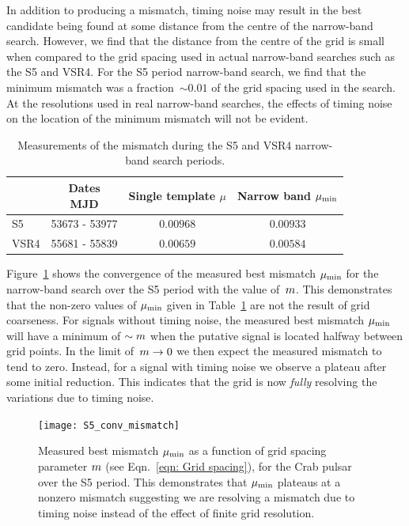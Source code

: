 \documentclass[../full_thesis/full_thesis.tex]{subfiles}
\begin{document}
In addition to producing a mismatch, timing noise may result in the best
candidate being found at some distance from the centre of the narrow-band
search.  However, we find that the distance from the centre of the grid is
small when compared to the grid spacing used in actual narrow-band searches
such as the S5 and VSR4.  For the S5 period narrow-band search, we find that
the minimum mismatch was a fraction~$\sim 0.01$ of the grid spacing used in the
\citet{ligo2008} search.  At the resolutions used in real narrow-band searches,
the effects of timing noise on the location of the minimum mismatch will not be
evident.

\begingroup
\small
\begin{table}[ht]
\centering
\begin{tabular}{lccc}
    &
    \specialcell{Dates \\ MJD} &
    \specialcell{Single  template \\ $\mu$} &
    \specialcell{Narrow band \\ $\mu_{\mathrm{min}}$} \\ \hline
S5 & 53673 - 53977 & $0.00968$ & $0.00933$ \\
VSR4 & 55681 - 55839 & $0.00659$ & $0.00584$ \\
\end{tabular}
\caption{Measurements of the mismatch during the S5 and VSR4 narrow-band search
         periods.}
\label{tab: Results}
\end{table}
\endgroup

Figure~\ref{fig: conv} shows the convergence of the measured best mismatch
$\mu_{\mathrm{min}}$ for the narrow-band search over the S5 period with the value
of~$m$.  This demonstrates that the non-zero values of $\mu_{\mathrm{min}}$ given in
Table~\ref{tab: Results} are not the result of grid coarseness.  For signals
without timing noise, the measured best mismatch $\mu_{\mathrm{min}}$ will have a minimum
of $\sim m$ when the putative signal is located halfway between grid
points. In the limit of~$m \rightarrow 0$ we then expect the measured
mismatch to tend to zero. Instead, for a signal with timing noise we observe a
plateau after some initial reduction. This indicates that the grid is now
\emph{fully} resolving the variations due to timing noise.
\begin{figure}[htb]
\centering
\texttt{[image: S5\_conv\_mismatch]}
\caption{Measured best mismatch $\mu_{\mathrm{min}}$ as a function
of grid spacing parameter $m$ (see Eqn.~\eqref{eqn: Grid spacing}), for the Crab pulsar over the S5 period.
    This demonstrates that $\mu_{\mathrm{min}}$ plateaus at a nonzero mismatch suggesting
    we are resolving a mismatch due to timing noise instead of the effect of finite
    grid resolution.}
\label{fig: conv}
\end{figure}
\end{document}
